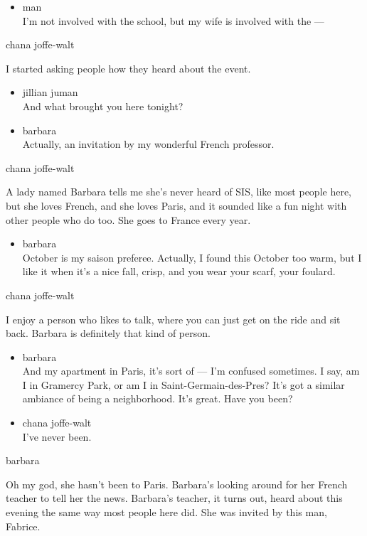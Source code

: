 \begin{itemize}
\tightlist
\item
  man\\
  I'm not involved with the school, but my wife is involved with the ---
\end{itemize}

chana joffe-walt

I started asking people how they heard about the event.

\begin{itemize}
\item
  jillian juman\\
  And what brought you here tonight?
\item
  barbara\\
  Actually, an invitation by my wonderful French professor.
\end{itemize}

chana joffe-walt

A lady named Barbara tells me she's never heard of SIS, like most people
here, but she loves French, and she loves Paris, and it sounded like a
fun night with other people who do too. She goes to France every year.

\begin{itemize}
\tightlist
\item
  barbara\\
  October is my saison preferee. Actually, I found this October too
  warm, but I like it when it's a nice fall, crisp, and you wear your
  scarf, your foulard.
\end{itemize}

chana joffe-walt

I enjoy a person who likes to talk, where you can just get on the ride
and sit back. Barbara is definitely that kind of person.

\begin{itemize}
\item
  barbara\\
  And my apartment in Paris, it's sort of --- I'm confused sometimes. I
  say, am I in Gramercy Park, or am I in Saint-Germain-des-Pres? It's
  got a similar ambiance of being a neighborhood. It's great. Have you
  been?
\item
  chana joffe-walt\\
  I've never been.
\end{itemize}

barbara

Oh my god, she hasn't been to Paris. Barbara's looking around for her
French teacher to tell her the news. Barbara's teacher, it turns out,
heard about this evening the same way most people here did. She was
invited by this man, Fabrice.

